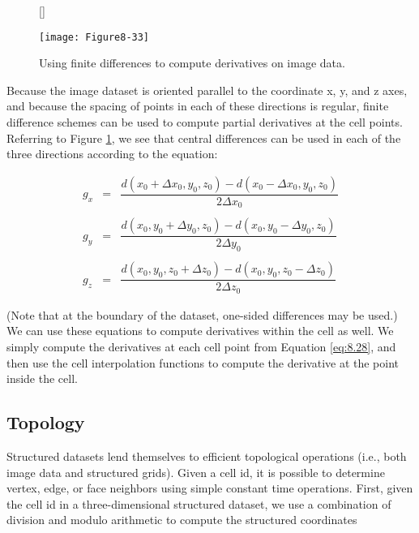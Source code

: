 \begin{figure}[!htb]
	[\FBwidth]
	{\caption{Using finite differences to compute derivatives on image data.}\label{fig:Figure8-33}}
	{\texttt{[image: Figure8-33]}}
\end{figure}


Because the image dataset is oriented parallel to the coordinate x, y, and z axes, and because the spacing of points in each of these directions is regular, finite difference schemes can be used to compute partial derivatives at the cell points. Referring to Figure \ref{fig:Figure8-33}, we see that central differences can be used in each of the three directions according to the equation:

\begin{equation}\label{eq:8.28}
\begin{array}{lll}
g_x &=& \dfrac{d(x_0 + \Delta x_0, y_0, z_0) - d(x_0 - \Delta x_0, y_0, z_0)}{2 \Delta x_0} \\ \\
g_y &=& \dfrac{d(x_0, y_0 + \Delta y_0, z_0) - d(x_0, y_0 - \Delta y_0, z_0)}{2 \Delta y_0} \\ \\
g_z &=& \dfrac{d(x_0, y_0, z_0 + \Delta z_0) - d(x_0, y_0, z_0 - \Delta z_0)}{2 \Delta z_0}
\end{array}
\end{equation}

(Note that at the boundary of the dataset, one-sided differences may be used.) We can use these equations to compute derivatives within the cell as well. We simply compute the derivatives at each cell point from Equation \ref{eq:8.28}, and then use the cell interpolation functions to compute the derivative at the point inside the cell.

\subsection{Topology}

Structured datasets lend themselves to efficient topological operations (i.e., both image data and structured grids). Given a cell id, it is possible to determine vertex, edge, or face neighbors using simple constant time operations. First, given the cell id in a three-dimensional structured dataset, we use a combination of division and modulo arithmetic to compute the structured coordinates


